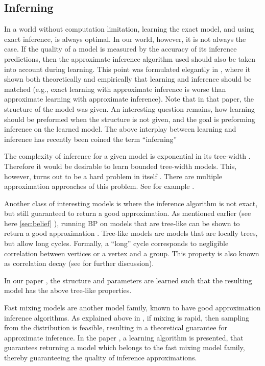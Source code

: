 \subsection{Inferning}
\label{sec:inferning}
In a world without computation limitation, learning the exact model,
and using exact inference, is always optimal. In our world, however, it
is not always the case.  If the quality of a model is measured by the accuracy
of its inference predictions, then the approximate inference algorithm used
should also be taken into account during learning. This point was formulated
elegantly in \cite{wainwright2006estimating}, where it shown both theoretically and empirically that learning and inference should be matched (e.g., exact learning with approximate inference is worse than approximate learning with approximate inference). Note that in that paper, the structure of the model was given.  An interesting question remains, how learning should be preformed when
the structure is not given, and the goal is preforming inference on
the learned model.
The above interplay between learning and inference has recently been coined the term ``inferning'' \cite{rohanimanesh2009training}

The complexity of inference for a given model is exponential in its tree-width \cite{robertson1983graph,robertson1994quickly}.
Therefore it would be desirable to learn bounded tree-width models.
This, however, turns out to be a hard problem in itself \cite{srebro2001maximum}. There are multiple approximation approaches of this problem. See for example \cite{karger2001learning,bach2001thin,elidan2009learning}.
%

Another class of interesting models is where the inference algorithm is not exact, but still guaranteed to return a good approximation. 
As mentioned earlier (see here \ref{sec:belief} ), running BP on models that are tree-like can be shown to return a good approximation \cite{dembo2010ising}.
Tree-like models are models that are locally trees, but allow long cycles.
Formally, a ``long'' cycle corresponds to negligible correlation between vertices or a vertex and a group. This property is also known as correlation decay (see  for further discussion).
In our paper \cite{heinemann2014inferning}, the structure and parameters are learned such that the resulting model has the above tree-like properties.
%

Fast mixing models are another model family,  known to have good approximation inference algorithms.
As explained above in , if mixing is rapid, then sampling from the distribution is feasible, resulting in a theoretical guarantee for approximate inference. 
In the paper \cite{domke2015maximum}, a learning algorithm is presented, that guarantees returning a model which belongs to the fast mixing model family,
thereby guaranteeing the quality of inference approximations.

